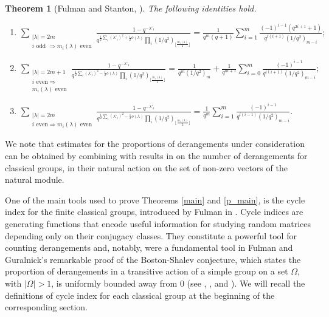 \documentclass[a4paper, 12pt, oneside]{amsart}
\newtheorem{thm}[prop]{Theorem}
\theoremstyle{definition}
\begin{document}
\begin{thm}[Fulman and Stanton, \cite{FulmanStanton25}]
\label{conj_identities}
The following identities hold.
\begin{enumerate}
\item
\label{conj_intro_sympl}
$\displaystyle\sum_{\substack{|\lambda|=2m\\ i \text{ odd }\Rightarrow m_i(\lambda) \text{ even}}}\frac{1-q^{-\lambda'_1}}{q^{\frac{1}{2}\sum_i(\lambda'_i)^2+\frac{1}{2}o(\lambda)}\prod_i(1/q^2)_{\lfloor\frac{m_i(\lambda)}{2}\rfloor}}=
\frac{1}{q^m(q+1)}\sum_{i=1}^{m}\frac{(-1)^{i-1}(q^{2i+1}+1)}{q^{i(i+1)}(1/q^2)_{m-i}};
$
\item 
\label{conj_intro_ort_2m+1}
$\displaystyle \sum_{\substack{|\lambda|=2m+1\\i \text{ even}\Rightarrow \\m_i(\lambda) \text{ even}}}\frac{1-q^{-\lambda'_1}}{q^{\frac{1}{2}\sum_i (\lambda'_i)^2-\frac{1}{2}o(\lambda)}\prod_i(1/q^2)_{\lfloor\frac{m_i(\lambda)}{2}\rfloor}}=\frac{1}{q^m(1/q^2)_{m}}+\frac{1}{q^{m+1}}\sum_{i=0}^{m}\frac{(-1)^{i-1}}{q^{i(i+1)}(1/q^2)_{m-i}};$

\item 
\label{conj_intro_ort_2m}
$\displaystyle \sum_{\substack{|\lambda|=2m\\i \text{ even}\Rightarrow m_i(\lambda) \text{ even}}}\frac{1-q^{-\lambda'_1}}{q^{\frac{1}{2}\sum_i (\lambda'_i)^2-\frac{1}{2}o(\lambda)}\prod_i(1/q^2)_{\lfloor\frac{m_i(\lambda)}{2}\rfloor}}
=\frac{1}{q^m}\sum_{i=1}^{m}\frac{(-1)^{i-1}}{q^{i(i-1)}(1/q^2)_{m-i}}.$
\end{enumerate}
\end{thm}

We note that estimates for the proportions of derangements under consideration can be obtained by combining \cite[Proposition~1.1]{GurTiep03} with results in \cite{NP98} on the number of derangements for  classical groups, in their natural action on the set of non-zero vectors of the natural module. 

One of the main tools used to prove Theorems \ref{main} and \ref{p_main}, 
is the cycle index for the finite classical groups, introduced by Fulman in \cite{Fulman_cycle_index}. 
Cycle indices are generating functions that encode useful information for studying random matrices depending only on their conjugacy classes. They constitute a powerful tool for counting derangements and, notably, were a fundamental tool in Fulman and Guralnick's remarkable proof of the Boston-Shalev conjecture, which states the proportion of derangements in a transitive action of a simple group on a set $\Omega$, with $|\Omega|>1$, is uniformly bounded away from 0 (see \cite{FGsimple}, \cite{FGChev}, \cite{FGsub} and \cite{FGext}). We will recall the definitions of cycle index for each classical group at the beginning of the corresponding section. 
\end{document}
